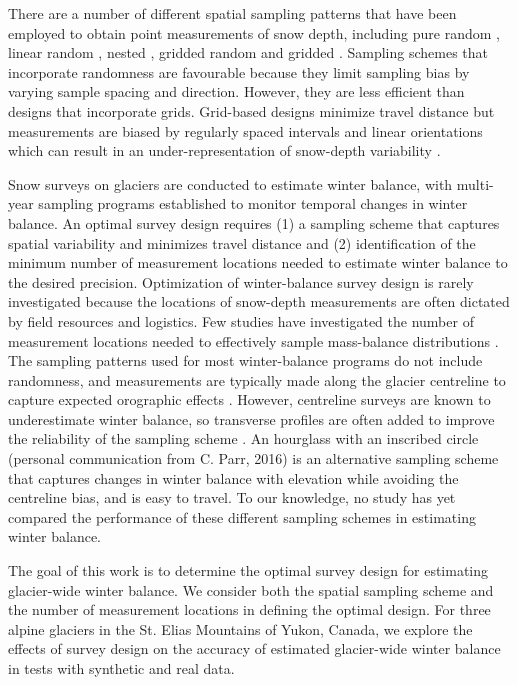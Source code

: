 \documentclass[twocolumn,letterpaper]{igs}
\begin{document}
There are a number of different spatial sampling patterns that have been employed to obtain point measurements of snow depth, including pure random \citep[e.g.][]{Elder1991}, linear random \cite[e.g.][]{Shea2010}, nested \citep[e.g.][]{Schweizer2008}, gridded random \citep[e.g.][]{Bellaire2008, Elder2009, Bellaire2011} and gridded \citep[e.g.][]{Molotch2005a, Kronholm2007, Lopez2011}. Sampling schemes that incorporate randomness are favourable because they limit sampling bias by varying sample spacing and direction. However, they are less efficient than designs that incorporate grids. Grid-based designs minimize travel distance but measurements are biased by regularly spaced intervals and linear orientations which can result in an under-representation of  snow-depth variability \citep{Kronholm2007}.

Snow surveys on glaciers are conducted to estimate winter balance, with multi-year sampling programs established to monitor temporal changes in winter balance. An optimal survey design requires (1) a sampling scheme that captures spatial variability and minimizes travel distance and (2) identification of the minimum number of measurement locations needed to estimate winter balance to the desired precision.  Optimization of winter-balance survey design is rarely investigated because the locations of snow-depth measurements are often dictated by field resources and logistics. 
Few studies have investigated the number of measurement locations needed to effectively sample mass-balance distributions \citep[c.f.][]{Fountain1999,Walmsley2015,Surjanovic2016}. The sampling patterns used for most winter-balance programs do not include randomness, and measurements are typically made along the glacier centreline \citep[e.g.][]{Kaser2003} to capture expected orographic effects \citep[e.g.][]{Grunewald2014}. However, centreline surveys are known to underestimate winter balance, so transverse profiles are often added to improve the reliability of the sampling scheme \citep[e.g.][]{Walmsley2015}. An hourglass with an inscribed circle (personal communication from C. Parr, 2016) is an alternative sampling scheme that captures changes in winter balance with elevation while avoiding the centreline bias, and is easy to travel. To our knowledge, no study has yet compared the performance of these different sampling schemes in estimating winter balance.

The goal of this work is to determine the optimal survey design for estimating glacier-wide winter balance. We consider both the spatial sampling scheme and the number of measurement locations in defining the optimal design. For three alpine glaciers in the St. Elias Mountains of Yukon, Canada, we explore the effects of survey design on the accuracy of estimated glacier-wide winter balance in tests with synthetic and real data.
\end{document}
